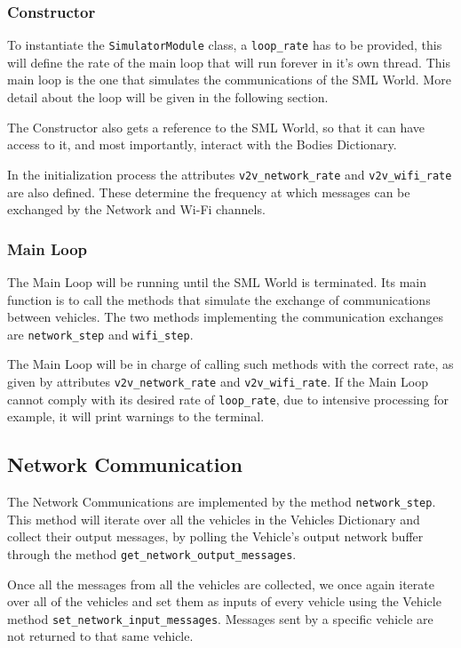 \subsubsection{Constructor}

To instantiate the \texttt{SimulatorModule} class, a \texttt{loop\_rate} has to be provided, this will define the rate of the main loop that will run forever in it's own thread. This main loop is the one that simulates the communications of the SML World. More detail about the loop will be given in the following section. 

The Constructor also gets a reference to the SML World, so that it can have access to it, and most importantly, interact with the Bodies Dictionary. 

In the initialization process the attributes \texttt{v2v\_network\_rate} and \texttt{v2v\_wifi\_rate} are also defined. These determine the frequency at which messages can be exchanged by the Network and Wi-Fi channels.

\subsubsection{Main Loop}

The Main Loop will be running until the SML World is terminated. Its main function is to call the methods that simulate the exchange of communications between vehicles. The two methods implementing the communication exchanges are \texttt{network\_step} and \texttt{wifi\_step}.

The Main Loop will be in charge of calling such methods with the correct rate, as given by attributes \texttt{v2v\_network\_rate} and \texttt{v2v\_wifi\_rate}. If the Main Loop cannot comply with its desired rate of \texttt{loop\_rate}, due to intensive processing for example, it will print warnings to the terminal.

\subsection{Network Communication}

The Network Communications are implemented by the method \texttt{network\_step}. This method will iterate over all the vehicles in the Vehicles Dictionary and collect their output messages, by polling the Vehicle's output network buffer through the method \texttt{get\_network\_output\_messages}.

Once all the messages from all the vehicles are collected, we once again iterate over all of the vehicles and set them as inputs of every vehicle using the Vehicle method \texttt{set\_network\_input\_messages}. Messages sent by a specific vehicle are not returned to that same vehicle.

